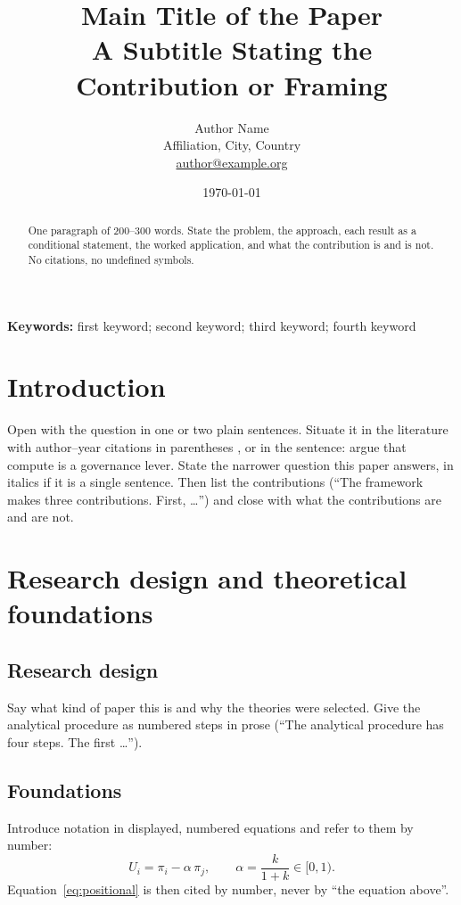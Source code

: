 \documentclass[11pt,a4paper]{article}
\title{\bfseries Main Title of the Paper\\[0.5ex]
  {\large\mdseries A Subtitle Stating the Contribution or Framing}}
\author{Author Name\\[0.3ex]
  {\normalsize Affiliation, City, Country}\\[0.3ex]
  {\normalsize\href{mailto:author@example.org}{author@example.org}}}
\date{\normalsize \today}
\theoremstyle{plain}
\theoremstyle{definition}
\theoremstyle{remark}
\begin{document}
\maketitle
\thispagestyle{plain}   %

\begin{abstract}
\noindent One paragraph of 200--300 words. State the problem, the approach, each
result as a conditional statement, the worked application, and what the
contribution is and is not. No citations, no undefined symbols.
\end{abstract}

\noindent\textbf{Keywords:} first keyword; second keyword; third keyword; fourth keyword

\section{Introduction}

Open with the question in one or two plain sentences. Situate it in the literature
with author--year citations in parentheses \citep{jervis1978, harsanyi1988}, or
in the sentence: \citet{sastry2024} argue that compute is a governance lever.
State the narrower question this paper answers, in italics if it is a single
sentence. Then list the contributions (``The framework makes three contributions.
First, \ldots'') and close with what the contributions are and are not.

\section{Research design and theoretical foundations}

\subsection{Research design}

Say what kind of paper this is and why the theories were selected. Give the
analytical procedure as numbered steps in prose (``The analytical procedure has
four steps. The first \ldots'').

\subsection{Foundations}

Introduce notation in displayed, numbered equations and refer to them by number:
\begin{equation}
  U_i = \pi_i - \alpha\,\pi_j, \qquad \alpha = \frac{k}{1+k} \in [0,1).
  \label{eq:positional}
\end{equation}
Equation~\eqref{eq:positional} is then cited by number, never by ``the equation above''.
\end{document}
